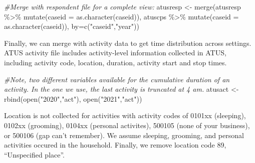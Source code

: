 \documentclass[
]{article}
\newenvironment{Shaded}{\begin{snugshade}}{\end{snugshade}}
\newcommand{\AttributeTok}[1]{\textcolor[rgb]{0.77,0.63,0.00}{#1}}
\newcommand{\CommentTok}[1]{\textcolor[rgb]{0.56,0.35,0.01}{\textit{#1}}}
\newcommand{\FunctionTok}[1]{\textcolor[rgb]{0.00,0.00,0.00}{#1}}
\newcommand{\NormalTok}[1]{#1}
\newcommand{\OtherTok}[1]{\textcolor[rgb]{0.56,0.35,0.01}{#1}}
\newcommand{\SpecialCharTok}[1]{\textcolor[rgb]{0.00,0.00,0.00}{#1}}
\newcommand{\StringTok}[1]{\textcolor[rgb]{0.31,0.60,0.02}{#1}}
\begin{document}
\begin{Shaded}
\begin{Highlighting}[]
\CommentTok{\#Merge with respondent file for a complete view:}
\NormalTok{atusresp }\OtherTok{\textless{}{-}} \FunctionTok{merge}\NormalTok{(atusresp }\SpecialCharTok{\%\textgreater{}\%} \FunctionTok{mutate}\NormalTok{(}\AttributeTok{caseid =} \FunctionTok{as.character}\NormalTok{(caseid)),}
\NormalTok{                  atuscps }\SpecialCharTok{\%\textgreater{}\%} \FunctionTok{mutate}\NormalTok{(}\AttributeTok{caseid =} \FunctionTok{as.character}\NormalTok{(caseid)),}
                  \AttributeTok{by=}\FunctionTok{c}\NormalTok{(}\StringTok{"caseid"}\NormalTok{,}\StringTok{"year"}\NormalTok{))}
\end{Highlighting}
\end{Shaded}

Finally, we can merge with activity data to get time distribution across
settings. ATUS activity file includes activity-level information
collected in ATUS, including activity code, location, duration, activity
start and stop times.

\begin{Shaded}
\begin{Highlighting}[]
\CommentTok{\#Note, two different variables available for the cumulative duration of an activity. In the one we use, the last activity is truncated at 4 am.}
\NormalTok{atusact }\OtherTok{\textless{}{-}} \FunctionTok{rbind}\NormalTok{(}\FunctionTok{open}\NormalTok{(}\StringTok{"2020"}\NormalTok{,}\StringTok{"act"}\NormalTok{),}
                 \FunctionTok{open}\NormalTok{(}\StringTok{"2021"}\NormalTok{,}\StringTok{"act"}\NormalTok{))}
\end{Highlighting}
\end{Shaded}

Location is not collected for activities with activity codes of 0101xx
(sleeping), 0102xx (grooming), 0104xx (personal activites), 500105 (none
of your business), or 500106 (gap can't remember). We assume sleeping,
grooming, and personal activities occured in the household. Finally, we
remove location code 89, ``Unspecified place''.
\end{document}
